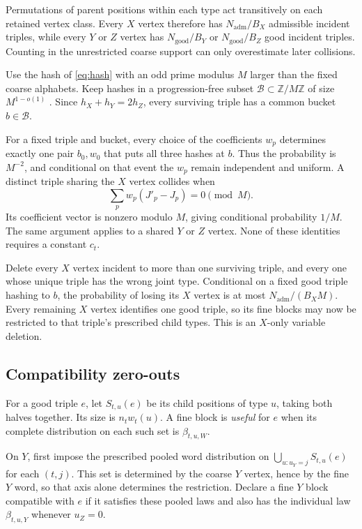 \documentclass[11pt,a4paper]{article}
\newcommand{\Ngood}{N_{\mathrm{good}}}
\newcommand{\Nadm}{N_{\mathrm{adm}}}
\newcommand{\ZZ}{\mathbb Z}
\begin{document}
Permutations of parent positions within each type act transitively on each retained vertex class. Every $X$ vertex therefore has $\Nadm/B_X$ admissible incident triples, while every $Y$ or $Z$ vertex has $\Ngood/B_Y$ or $\Ngood/B_Z$ good incident triples. Counting in the unrestricted coarse support can only overestimate later collisions.

Use the hash of \cref{eq:hash} with an odd prime modulus $M$ larger than the fixed coarse alphabets. Keep hashes in a progression-free subset $\mathcal B\subset\ZZ/M\ZZ$ of size $M^{1-o(1)}$ \citep{behrend1946,alman2025}. Since $h_X+h_Y=2h_Z$, every surviving triple has a common bucket $b\in\mathcal B$.

For a fixed triple and bucket, every choice of the coefficients $w_p$ determines exactly one pair $b_0,w_0$ that puts all three hashes at $b$. Thus the probability is $M^{-2}$, and conditional on that event the $w_p$ remain independent and uniform. A distinct triple sharing the $X$ vertex collides when
\[
\sum_p w_p(J'_p-J_p)=0\pmod M.
\]
Its coefficient vector is nonzero modulo $M$, giving conditional probability $1/M$. The same argument applies to a shared $Y$ or $Z$ vertex. None of these identities requires a constant $c_t$.

Delete every $X$ vertex incident to more than one surviving triple, and every one whose unique triple has the wrong joint type. Conditional on a fixed good triple hashing to $b$, the probability of losing its $X$ vertex is at most $\Nadm/(B_XM)$. Every remaining $X$ vertex identifies one good triple, so its fine blocks may now be restricted to that triple's prescribed child types. This is an $X$-only variable deletion.

\subsection{Compatibility zero-outs}

For a good triple $e$, let $S_{t,u}(e)$ be its child positions of type $u$, taking both halves together. Its size is $n_tw_t(u)$. A fine block is \emph{useful} for $e$ when its complete distribution on each such set is $\beta_{t,u,W}$.

On $Y$, first impose the prescribed pooled word distribution on
$\bigcup_{u:u_Y=j}S_{t,u}(e)$ for each $(t,j)$. This set is determined by the coarse $Y$ vertex, hence by the fine $Y$ word, so that axis alone determines the restriction. Declare a fine $Y$ block compatible with $e$ if it satisfies these pooled laws and also has the individual law $\beta_{t,u,Y}$ whenever $u_Z=0$.
\end{document}
